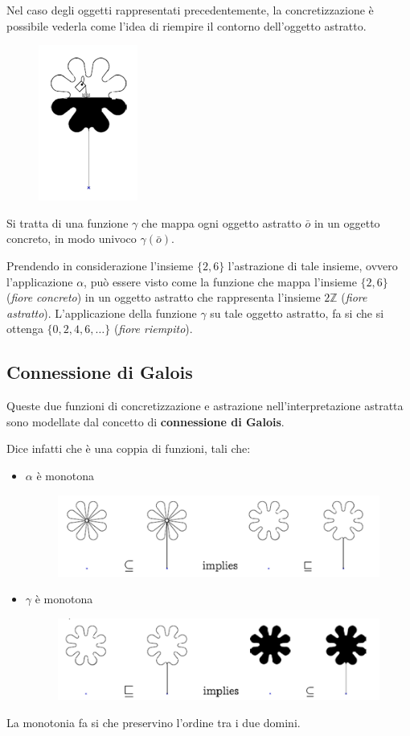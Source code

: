 Nel caso degli oggetti rappresentati precedentemente, la concretizzazione
è possibile vederla come l'idea di riempire il contorno dell'oggetto astratto.
\begin{figure}[H]
    \centering
    \includegraphics[scale=0.6]{img/concretizzazione.png}
\end{figure}
Si tratta di una funzione $\gamma$ che mappa ogni oggetto
astratto $\bar{o}$ in un oggetto concreto, in modo univoco
$\gamma(\bar{o})$.

Prendendo in considerazione l'insieme $\{2,6\}$ l'astrazione
di tale insieme, ovvero l'applicazione $\alpha$, può essere visto come la 
funzione che mappa l'insieme $\{2,6\}$ (\textit{fiore concreto}) in un oggetto astratto
che rappresenta l'insieme $2\mathbb{Z}$ (\textit{fiore astratto}). L'applicazione 
della funzione $\gamma$ su tale oggetto astratto, fa si che 
si ottenga $\{0,2,4,6,\dots\}$ (\textit{fiore riempito}).
\subsection{Connessione di Galois}
Queste due funzioni di concretizzazione e astrazione nell'interpretazione
astratta sono modellate dal concetto di \textbf{connessione di Galois}.

Dice infatti che è una coppia di funzioni, tali che:
\begin{itemize}
    \item $\alpha$ è monotona
    \begin{figure}[H]
        \centering
        \includegraphics[scale=0.6]{img/galoisconn1.png}
    \end{figure}
    \item $\gamma$ è monotona
    \begin{figure}[H]
        \centering
        \includegraphics[scale=0.6]{img/galoisconn2.png}
    \end{figure}
\end{itemize}
La monotonia fa si che preservino l'ordine tra i due domini.

